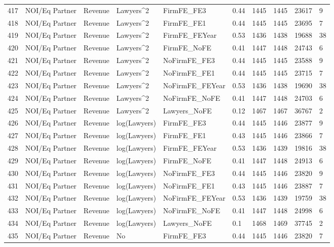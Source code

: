 \documentclass{article}
\begin{document}
\begin{table}[H]
\begin{tabular}{rlllllllll}
  417 & NOI/Eq Partner & Revenue & Lawyers^2 & FirmFE\_FE3 & 0.44 & 1445 & 1445 & 23617 & 9 \\ 
  418 & NOI/Eq Partner & Revenue & Lawyers^2 & FirmFE\_FE1 & 0.44 & 1445 & 1445 & 23695 & 7 \\ 
  419 & NOI/Eq Partner & Revenue & Lawyers^2 & FirmFE\_FEYear & 0.53 & 1436 & 1438 & 19688 & 38 \\ 
  420 & NOI/Eq Partner & Revenue & Lawyers^2 & FirmFE\_NoFE & 0.41 & 1447 & 1448 & 24743 & 6 \\ 
  421 & NOI/Eq Partner & Revenue & Lawyers^2 & NoFirmFE\_FE3 & 0.44 & 1445 & 1445 & 23588 & 9 \\ 
  422 & NOI/Eq Partner & Revenue & Lawyers^2 & NoFirmFE\_FE1 & 0.44 & 1445 & 1445 & 23715 & 7 \\ 
  423 & NOI/Eq Partner & Revenue & Lawyers^2 & NoFirmFE\_FEYear & 0.53 & 1436 & 1438 & 19690 & 38 \\ 
  424 & NOI/Eq Partner & Revenue & Lawyers^2 & NoFirmFE\_NoFE & 0.41 & 1447 & 1448 & 24703 & 6 \\ 
  425 & NOI/Eq Partner & Revenue & Lawyers^2 & Lawyers\_NoFE & 0.12 & 1467 & 1467 & 36767 & 2 \\ 
  426 & NOI/Eq Partner & Revenue & log(Lawyers) & FirmFE\_FE3 & 0.44 & 1445 & 1446 & 23877 & 9 \\ 
  427 & NOI/Eq Partner & Revenue & log(Lawyers) & FirmFE\_FE1 & 0.43 & 1445 & 1446 & 23866 & 7 \\ 
  428 & NOI/Eq Partner & Revenue & log(Lawyers) & FirmFE\_FEYear & 0.53 & 1436 & 1439 & 19816 & 38 \\ 
  429 & NOI/Eq Partner & Revenue & log(Lawyers) & FirmFE\_NoFE & 0.41 & 1447 & 1448 & 24913 & 6 \\ 
  430 & NOI/Eq Partner & Revenue & log(Lawyers) & NoFirmFE\_FE3 & 0.44 & 1445 & 1446 & 23820 & 9 \\ 
  431 & NOI/Eq Partner & Revenue & log(Lawyers) & NoFirmFE\_FE1 & 0.43 & 1445 & 1446 & 23887 & 7 \\ 
  432 & NOI/Eq Partner & Revenue & log(Lawyers) & NoFirmFE\_FEYear & 0.53 & 1436 & 1439 & 19759 & 38 \\ 
  433 & NOI/Eq Partner & Revenue & log(Lawyers) & NoFirmFE\_NoFE & 0.41 & 1447 & 1448 & 24998 & 6 \\ 
  434 & NOI/Eq Partner & Revenue & log(Lawyers) & Lawyers\_NoFE & 0.1 & 1468 & 1469 & 37745 & 2 \\ 
  435 & NOI/Eq Partner & Revenue & No & FirmFE\_FE3 & 0.44 & 1445 & 1446 & 23820 & 7 \\ 

\end{tabular}
\end{table}
\end{document}
